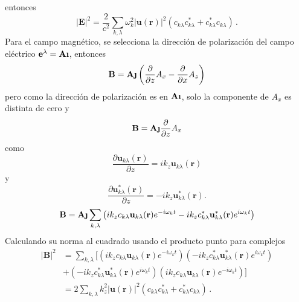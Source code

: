entonces
\begin{equation}
\label{EM.18}
\vert\mathbf{E}\vert^2 = \frac{2}{c^2}\sum_{k,\lambda} \omega_{k}^2  |\mathbf{u}(\mathbf{r})|^2 \left( c_{k\lambda} c_{k\lambda}^* + c_{k\lambda}^* c_{k\lambda} \right) \,.
\end{equation}
Para el campo magnético, se selecciona la dirección de polarización del campo eléctrico 
$\mathbf{e}^{\lambda}= \mathbf{\hat{\textnormal{\bfseries\i}}}$, entonces
\begin{equation*}
\mathbf{B} = \mathbf{\hat{\textnormal{\bfseries\j}}} \left( \frac{\partial}{\partial z} A_x - \frac{\partial}{\partial x} A_z \right)
\end{equation*}
pero como la dirección de polarización es en $\mathbf{\hat{\textnormal{\bfseries\i}}}$, solo la componente de $A_x$ es distinta de cero y
\begin{equation*}
\mathbf{B} = \mathbf{\hat{\textnormal{\bfseries\j}}} \frac{\partial}{\partial z} A_x
\end{equation*}
como 
\begin{equation*}
\frac{\partial \mathbf{u}_{k\lambda}(\mathbf{r})}{\partial z} = i k_z \mathbf{u}_{k\lambda}(\mathbf{r})
\end{equation*} 
y 
\begin{equation*}
\frac{\partial \mathbf{u}^{*}_{k\lambda}(\mathbf{r})}{\partial z} = -i k_z \mathbf{u}^{*}_{k\lambda}(\mathbf{r}).
\end{equation*}
\begin{equation*}
\mathbf{B} = \mathbf{\hat{\textnormal{\bfseries\j}}} \sum_{k,\lambda} \left( i k_z c_{k\lambda} \mathbf{u}_{k\lambda}(\mathbf{r})e^{-i\omega_{k} t} - i k_z c_{k\lambda}^* \mathbf{u}_{k\lambda}^*(\mathbf{r})e^{i\omega_{k} t}  \right)
\end{equation*}
Calculando su norma al cuadrado usando el producto punto para complejos
\begin{align*}
|\mathbf{B}|^2 & = \sum_{k,\lambda} \Big[ \left(ik_z c_{k\lambda} \mathbf{u}_{k\lambda}(\mathbf{r})e^{-i\omega_{k} t}\right)\left(-ik_z c_{k\lambda}^{*} \mathbf{u}_{k\lambda}^*(\mathbf{r})e^{i\omega_{k} t} \right) \\
& + \left(-ik_z c_{k\lambda}^{*} \mathbf{u}_{k\lambda}^*(\mathbf{r})e^{i\omega_{k} t} \right)  \left(ik_z c_{k\lambda} \mathbf{u}_{k\lambda}(\mathbf{r})e^{-i\omega_{k} t}\right) \Big]                \\
& = 2 \sum_{k,\lambda} k_z^2 |\mathbf{u}(\mathbf{r})|^2 \left( c_{k\lambda} c_{k\lambda}^* + c_{k\lambda}^* c_{k\lambda} \right) \,.
\end{align*}
